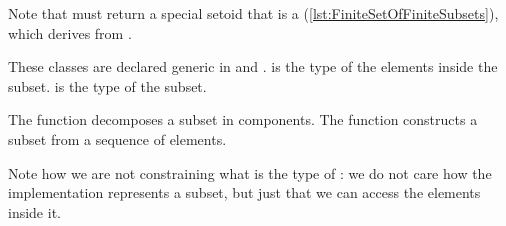 


Note that  must return a special setoid that is a  (\cref{lst:FiniteSetOfFiniteSubsets}), which derives from .




These classes are declared generic in  and .
 is the type of the elements inside the subset.
 is the type of the subset. 

The function  decomposes a subset in components.
The function  constructs a subset from a sequence of elements.

Note how we are not constraining what is the type of : we do not care how the implementation represents a subset, but just that we can access the elements inside it.